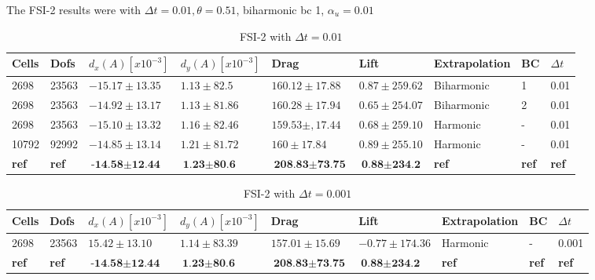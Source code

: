 The FSI-2 results were with $\Delta t = 0.01, \theta = 0.51$, biharmonic bc 1, $\alpha_u = 0.01$
\begin{table}[H]
\centering
\caption{FSI-2 with $\Delta t = 0.01$}
\label{my-label}
\begin{tabular}{|l|l|l|l|l|l|l|l|l|}
\hline
Cells & Dofs & $d_x(A) [x10^{-3}]$ & $d_y(A) [x10^{-3}]$ & Drag & Lift & Extrapolation & BC & $\Delta t$ \\ \hline
2698 & 23563 & $-15.17 \pm 13.35  $ & $1.13 \pm 82.5$ & $160.12 \pm 17.88$ & $0.87 \pm 259.62$ & Biharmonic & 1 & 0.01 \\ \hline
2698 & 23563 & $-14.92 \pm 13.17 $ & $1.13 \pm 81.86$ & $160.28 \pm 17.94$ & $0.65 \pm 254.07$ & Biharmonic & 2 & 0.01 \\ \hline
2698 & 23563 & $-15.10 \pm 13.32 $ & $1.16 \pm 82.46 $ & $159.53 \pm,17.44 $ & $ 0.68 \pm 259.10 $ & Harmonic & - & 0.01 \\ \hline
10792 & 92992 & $-14.85 \pm 13.14 $ & $1.21 \pm 81.72$ & $ 160 \pm 17.84  $ & $0.89 \pm 255.10 $ & Harmonic & - & 0.01 \\ \hline
\textbf{ref} & \textbf{ref} & $\textbf{-14.58} \pm \textbf{12.44}$ & $\textbf{1.23} \pm \textbf{80.6}$ & $\textbf{208.83} \pm \textbf{73.75}  $ & $\textbf{0.88} \pm \textbf{234.2} $ & \textbf{ref} & \textbf{ref} & \textbf{ref} \\ \hline
\end{tabular}
\end{table}
\begin{table}[H]
\centering
\caption{FSI-2 with $\Delta t = 0.001$}
\label{my-label}
\begin{tabular}{|l|l|l|l|l|l|l|l|l|}
\hline
Cells & Dofs & $d_x(A) [x10^{-3}]$ & $d_y(A) [x10^{-3}]$ & Drag & Lift & Extrapolation & BC & $\Delta t$ \\ \hline
2698 & 23563 & $ 15.42 \pm 13.10$ & $1.14 \pm 83.39$ & $157.01 \pm 15.69$ &$ -0.77 \pm 174.36$ & Harmonic & - & 0.001 \\ \hline
\textbf{ref} & \textbf{ref} & $\textbf{-14.58} \pm \textbf{12.44}$ & $\textbf{1.23} \pm \textbf{80.6}$ & $\textbf{208.83} \pm \textbf{73.75}  $ & $\textbf{0.88} \pm \textbf{234.2} $ & \textbf{ref} & \textbf{ref} & \textbf{ref} \\ \hline
\end{tabular}
\end{table}


